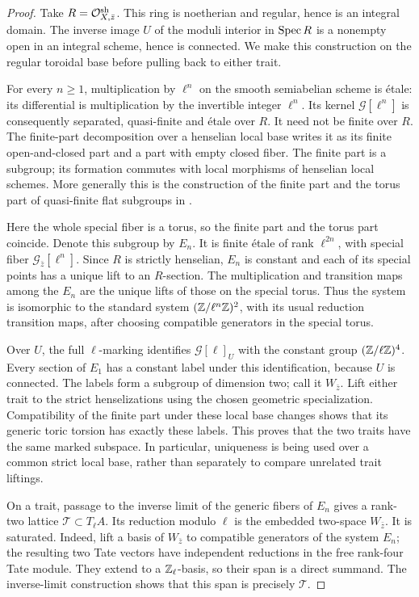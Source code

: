 \begin{proof}
Take $R=\mathcal O^{\mathrm{sh}}_{X,\bar z}$.  This ring is noetherian
and regular, hence is an integral domain.  The inverse image $U$ of
the moduli interior in $\operatorname{Spec} R$ is a nonempty open in an integral
scheme, hence is connected.  We make this construction on the
regular toroidal base before pulling back to either trait.

For every $n\ge1$, multiplication by $\ell^n$ on the smooth
semiabelian scheme is \'etale: its differential is multiplication by
the invertible integer $\ell^n$.  Its kernel $\mathcal G[\ell^n]$
is consequently separated, quasi-finite and \'etale over $R$.
It need not be finite over $R$.  The finite-part decomposition over
a henselian local base writes it as its finite open-and-closed part
and a part with empty closed fiber.  The finite part is a subgroup;
its formation commutes with local morphisms of henselian local
schemes.  More generally this is the construction of the finite
part and the torus part of quasi-finite flat subgroups in
\cite[\S3.4.1, equations~(3.4.1.1)--(3.4.1.4)]{Lan2013}.

Here the whole special fiber is a torus, so the finite part and the
torus part coincide.  Denote this subgroup by $E_n$.  It is finite
\'etale of rank $\ell^{2n}$, with special fiber
$\mathcal G_{\bar z}[\ell^n]$.  Since $R$ is strictly henselian,
$E_n$ is constant and each of its special points has a unique lift
to an $R$-section.  The multiplication and transition maps among
the $E_n$ are the unique lifts of those on the special torus.  Thus
the system is isomorphic to the standard system
$(\mathbb Z/\ell^n\mathbb Z)^2$, with its usual reduction transition maps,
after choosing compatible generators in the special torus.

Over $U$, the full $\ell$-marking identifies
$\mathcal G[\ell]_U$ with the constant group $(\mathbb Z/\ell\mathbb Z)^4$.
Every section of $E_1$ has a constant label under this identification,
because $U$ is connected.  The labels form a subgroup of dimension
two; call it $W_{\bar z}$.  Lift either trait to the strict
henselizations using the chosen geometric specialization.  Compatibility
of the finite part under these local base changes shows that its
generic toric torsion has exactly these labels.  This proves that
the two traits have the same marked subspace.  In particular,
uniqueness is being used over a common strict local base, rather
than separately to compare unrelated trait liftings.

On a trait, passage to the inverse limit of the generic fibers of
$E_n$ gives a rank-two lattice $\mathcal T\subset T_\ell A$.
Its reduction modulo $\ell$ is the embedded two-space $W_{\bar z}$.
It is saturated.  Indeed, lift a basis of $W_{\bar z}$ to compatible
generators of the system $E_n$; the resulting two Tate vectors have
independent reductions in the free rank-four Tate module.  They
extend to a $\mathbb Z_\ell$-basis, so their span is a direct summand.
The inverse-limit construction shows that this span is precisely
$\mathcal T$.


\end{proof}
